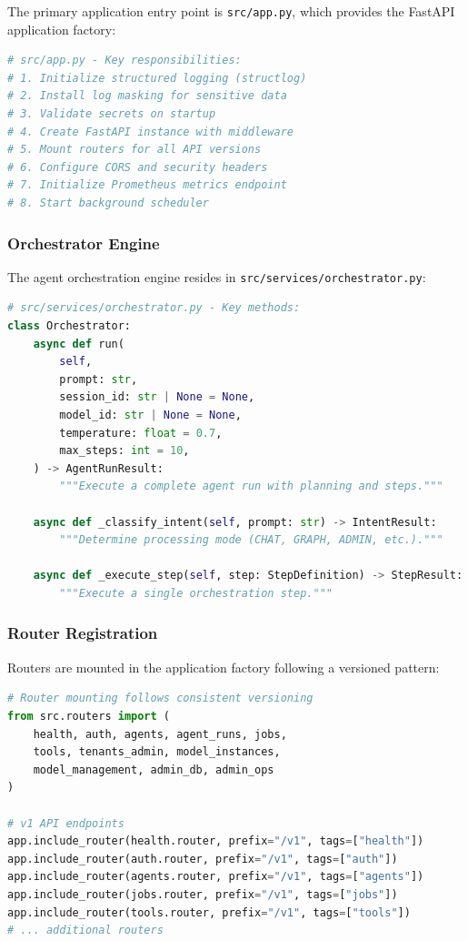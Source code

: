 The primary application entry point is \texttt{src/app.py}, which provides the FastAPI application factory:

\begin{lstlisting}[language=Python, caption={Application factory responsibilities.}]
# src/app.py - Key responsibilities:
# 1. Initialize structured logging (structlog)
# 2. Install log masking for sensitive data
# 3. Validate secrets on startup
# 4. Create FastAPI instance with middleware
# 5. Mount routers for all API versions
# 6. Configure CORS and security headers
# 7. Initialize Prometheus metrics endpoint
# 8. Start background scheduler
\end{lstlisting}

\subsubsection{Orchestrator Engine}

The agent orchestration engine resides in \texttt{src/services/orchestrator.py}:

\begin{lstlisting}[language=Python, caption={Orchestrator entry points.}]
# src/services/orchestrator.py - Key methods:
class Orchestrator:
    async def run(
        self, 
        prompt: str,
        session_id: str | None = None,
        model_id: str | None = None,
        temperature: float = 0.7,
        max_steps: int = 10,
    ) -> AgentRunResult:
        """Execute a complete agent run with planning and steps."""
        
    async def _classify_intent(self, prompt: str) -> IntentResult:
        """Determine processing mode (CHAT, GRAPH, ADMIN, etc.)."""
        
    async def _execute_step(self, step: StepDefinition) -> StepResult:
        """Execute a single orchestration step."""
\end{lstlisting}

\subsubsection{Router Registration}

Routers are mounted in the application factory following a versioned pattern:

\begin{lstlisting}[language=Python, caption={Router registration pattern from \texttt{src/app.py}.}]
# Router mounting follows consistent versioning
from src.routers import (
    health, auth, agents, agent_runs, jobs,
    tools, tenants_admin, model_instances,
    model_management, admin_db, admin_ops
)

# v1 API endpoints
app.include_router(health.router, prefix="/v1", tags=["health"])
app.include_router(auth.router, prefix="/v1", tags=["auth"])
app.include_router(agents.router, prefix="/v1", tags=["agents"])
app.include_router(jobs.router, prefix="/v1", tags=["jobs"])
app.include_router(tools.router, prefix="/v1", tags=["tools"])
# ... additional routers
\end{lstlisting}


